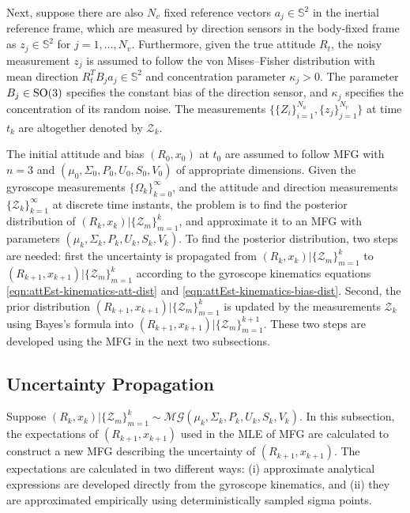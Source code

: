 Next, suppose there are also $N_v$ fixed reference vectors ${a}_j\in\mathbb{S}^2$ in the inertial reference frame, which are measured by direction sensors in the body-fixed frame as ${z}_j\in\mathbb{S}^2$ for $j=1,\ldots,N_v$.
Furthermore, given the true attitude $R_t$, the noisy measurement ${z}_j$ is assumed to follow the von Mises--Fisher distribution \cite{mardia2009directional} with mean direction $R_t^TB_j{a}_j\in\mathbb{S}^2$ and concentration parameter $\kappa_j>0$.
The parameter $B_j\in\mathrm{SO}(3)$ specifies the constant bias of the direction sensor, and $\kappa_j$ specifies the concentration of its random noise.
The measurements $\Big\{\{Z_i\}_{i=1}^{N_a}, \{z_j\}_{j=1}^{N_v}\Big\}$ at time $t_k$ are altogether denoted by $\mathcal{Z}_k$.

The initial attitude and bias $(R_0,x_0)$ at $t_0$ are assumed to follow MFG with $n=3$ and $(\mu_0, \Sigma_0, P_0, U_0, S_0, V_0)$ of appropriate dimensions.
Given the gyroscope measurements $\{\Omega_k\}_{k=0}^\infty$, and the attitude and direction measurements $\{\mathcal{Z}_k\}_{k=1}^\infty$ at discrete time instants, the problem is to find the posterior distribution of $(R_k,x_k) | \{\mathcal{Z}_m\}_{m=1}^k$, and approximate it to an MFG with parameters $(\mu_k, \Sigma_k, P_k, U_k, S_k, V_k)$.
To find the posterior distribution, two steps are needed: first the uncertainty is propagated from $(R_k,x_k) | \{\mathcal{Z}_m\}_{m=1}^k$ to $(R_{k+1},x_{k+1}) | \{\mathcal{Z}_m\}_{m=1}^k$ according to the gyroscope kinematics equations \eqref{eqn:attEst-kinematics-att-dist} and \eqref{eqn:attEst-kinematics-bias-dist}.
Second, the prior distribution $(R_{k+1},x_{k+1}) | \{\mathcal{Z}_m\}_{m=1}^k$ is updated by the measurements $\mathcal{Z}_k$ using Bayes's formula into $(R_{k+1},x_{k+1}) | \{\mathcal{Z}_m\}_{m=1}^{k+1}$.
These two steps are developed using the MFG in the next two subsections.

\subsection{Uncertainty Propagation} \label{section:attEst-propagation}

Suppose $(R_k,x_k) | \{\mathcal{Z}_m\}_{m=1}^k \sim\mathcal{MG}(\mu_k, \Sigma_k, P_k, U_k, S_k, V_k)$. 
In this subsection, the expectations of $(R_{k+1},x_{k+1})$ used in the MLE of MFG are calculated to construct a new MFG describing the uncertainty of $(R_{k+1},x_{k+1})$.
The expectations are calculated in two different ways: (i) approximate analytical expressions are developed directly from the gyroscope kinematics, and (ii) they are approximated empirically using deterministically sampled sigma points.

